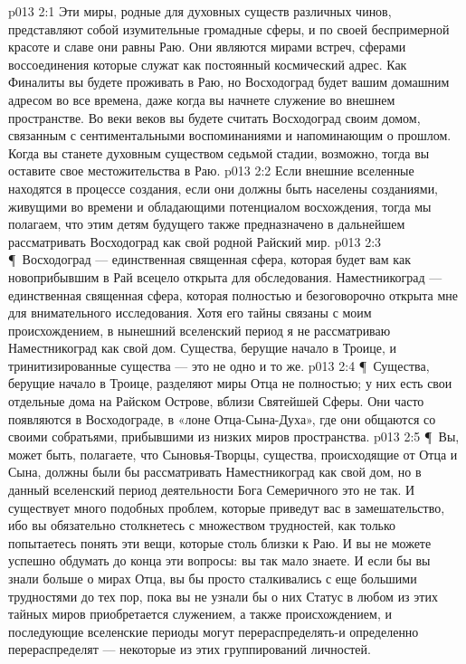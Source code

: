 \vs p013 2:1 Эти миры, родные для духовных существ различных чинов, представляют собой изумительные громадные сферы, и по своей беспримерной красоте и славе они равны Раю. Они являются мирами встреч, сферами воссоединения которые служат как постоянный космический адрес. Как Финалиты вы будете проживать в Раю, но Восходоград будет вашим домашним адресом во все времена, даже когда вы начнете служение во внешнем пространстве. Во веки веков вы будете считать Восходоград своим домом, связанным с сентиментальными воспоминаниями и напоминающим о прошлом. Когда вы станете духовным существом седьмой стадии, возможно, тогда вы оставите свое местожительства в Раю.
\vs p013 2:2 Если внешние вселенные находятся в процессе создания, если они должны быть населены созданиями, живущими во времени и обладающими потенциалом восхождения, тогда мы полагаем, что этим детям будущего также предназначено в дальнейшем рассматривать Восходоград как свой родной Райский мир.
\vs p013 2:3 \P\ Восходоград --- единственная священная сфера, которая будет вам как новоприбывшим в Рай всецело открыта для обследования. Наместникоград --- единственная священная сфера, которая полностью и безоговорочно открыта мне для внимательного исследования. Хотя его тайны связаны с моим происхождением, в нынешний вселенский период я не рассматриваю Наместникоград как свой дом. Существа, берущие начало в Троице, и тринитизированные существа --- это не одно и то же.
\vs p013 2:4 \P\ Существа, берущие начало в Троице, разделяют миры Отца не полностью; у них есть свои отдельные дома на Райском Острове, вблизи Святейшей Сферы. Они часто появляются в Восходограде, в «лоне Отца\hyp{}Сына\hyp{}Духа», где они общаются со своими собратьями, прибывшими из низких миров пространства.
\vs p013 2:5 \P\ Вы, может быть, полагаете, что Сыновья\hyp{}Творцы, существа, происходящие от Отца и Сына, должны были бы рассматривать Наместникоград как свой дом, но в данный вселенский период деятельности Бога Семеричного это не так. И существует много подобных проблем, которые приведут вас в замешательство, ибо вы обязательно столкнетесь с множеством трудностей, как только попытаетесь понять эти вещи, которые столь близки к Раю. И вы не можете успешно обдумать до конца эти вопросы: вы так мало знаете. И если бы вы знали больше о мирах Отца, вы бы просто сталкивались с еще большими трудностями до тех пор, пока вы не узнали бы о них  Статус в любом из этих тайных миров приобретается служением, а также происхождением, и последующие вселенские периоды могут перераспределять\hyp{}и определенно перераспределят --- некоторые из этих группирований личностей.
